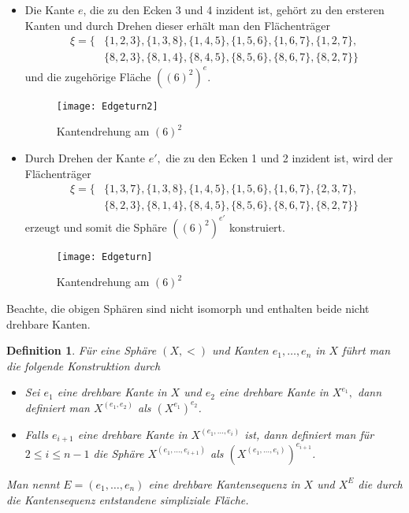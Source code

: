 \documentclass[12pt,titlepage,twoside,cleardoublepage]{article}
\theoremstyle{nummermitklammern}
\newtheorem{definition}[temp]{Definition}
\newtheorem{definition}[zahl]{Definition}
\numberwithin{equation}{section}
\begin{document}
\begin{itemize}
\item Die Kante $e$, die zu den Ecken 3 und 4 inzident ist, gehört zu den ersteren Kanten und durch Drehen dieser erhält man den Flächenträger 
\begin{align*}
\xi=\{&\{1,2,3\},\{1,3,8\},\{1,4,5\},\{1,5,6\},\{1,6,7\},\{1,2,7\},\\ 
&\{8,2,3\},\{8,1,4\},\{8,4,5\},\{8,5,6\},\{8,6,7\},\{8,2,7\}\}
\end{align*}
und die zugehörige Fläche ${((6)^2)}^e.$
\begin{figure}[H]
\begin{center}
\texttt{[image: Edgeturn2]}
\end{center}
\caption{Kantendrehung am $(6)^2$ }
\end{figure}
\item Durch Drehen der Kante $e',$ die zu den Ecken 1 und 2 inzident ist, wird der Flächenträger 
\begin{align*}
\xi=\{&\{1,3,7\},\{1,3,8\},\{1,4,5\},\{1,5,6\},\{1,6,7\},\{2,3,7\},\\ 
&\{8,2,3\},\{8,1,4\},\{8,4,5\},\{8,5,6\},\{8,6,7\},\{8,2,7\}\}
\end{align*}
erzeugt und somit die Sphäre ${((6)^2)}^{e'}$ konstruiert.
\begin{figure}[H]
\begin{center}
\texttt{[image: Edgeturn]}
\end{center}
\caption{Kantendrehung am $(6)^2$ }
\end{figure}
\end{itemize}
Beachte, die obigen Sphären sind nicht isomorph und enthalten beide nicht drehbare Kanten.
\begin{definition}
Für eine Sphäre $(X,<)$ und Kanten $e_1,\ldots,e_n$ in $X$ führt man die folgende Konstruktion durch
\begin{itemize}
\item Sei $e_1$ eine drehbare Kante in $X$ und $e_2$ eine drehbare Kante in $X^{e_1},$ dann definiert man $X^{(e_1,e_2)}$ als $(X^{e_1})^{e_2}$.
\item Falls $e_{i+1}$ eine drehbare Kante in $X^{(e_1,\ldots,e_{i})}$ ist, dann definiert man für $2\leq i\leq n-1$ die Sphäre $X^{(e_1,\ldots,e_{i+1})}$ als $(X^{(e_1,\ldots,e_{i})})^{e_{i+1}}$.
\end{itemize}
Man nennt $E=(e_1,\ldots,e_n)$ eine drehbare Kantensequenz in $X$ und $X^E$ die durch die Kantensequenz entstandene simpliziale Fläche. 
\end{definition}
\end{document}
